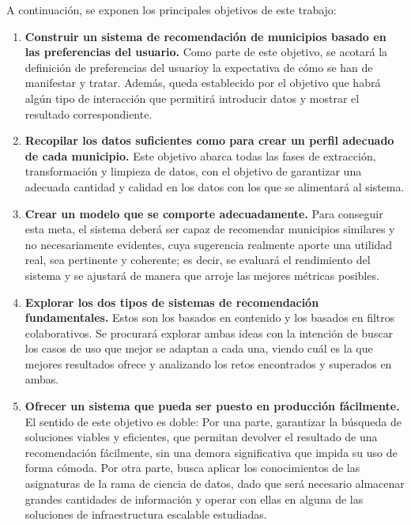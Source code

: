 
A continuación, se exponen los principales objetivos de este trabajo:

\begin{enumerate}
    \item \textbf{Construir un sistema de recomendación de municipios basado en las preferencias del usuario.} Como parte de este objetivo, se acotará la definición de \guillemotleft preferencias del usuario\guillemotright\space y la expectativa de cómo se han de manifestar y tratar. Además, queda establecido por el objetivo que habrá algún tipo de interacción que permitirá introducir datos y mostrar el resultado correspondiente.
    \item \textbf{Recopilar los datos suficientes como para crear un perfil adecuado de cada municipio.} Este objetivo abarca todas las fases de extracción, transformación y limpieza de datos, con el objetivo de garantizar una adecuada cantidad y calidad en los datos con los que se alimentará al sistema.
    \item \textbf{Crear un modelo que se comporte adecuadamente.} Para conseguir esta meta, el sistema deberá ser capaz de recomendar municipios similares y no necesariamente evidentes, cuya sugerencia realmente aporte una utilidad real, sea pertinente y coherente; es decir, se evaluará el rendimiento del sistema y se ajustará de manera que arroje las mejores métricas posibles.
    \item \textbf{Explorar los dos tipos de sistemas de recomendación fundamentales.} Estos son los basados en contenido y los basados en filtros colaborativos. Se procurará explorar ambas ideas con la intención de buscar los casos de uso que mejor se adaptan a cada una, viendo cuál es la que mejores resultados ofrece y analizando los retos encontrados y superados en ambas.
    \item \textbf{Ofrecer un sistema que pueda ser puesto en producción fácilmente.} El sentido de este objetivo es doble: Por una parte, garantizar la búsqueda de soluciones viables y eficientes, que permitan devolver el resultado de una recomendación fácilmente, sin una demora significativa que impida su uso de forma cómoda. Por otra parte, busca aplicar los conocimientos de las asignaturas de la rama de ciencia de datos, dado que será necesario almacenar grandes cantidades de información y operar con ellas en alguna de las soluciones de infraestructura escalable estudiadas.

\end{enumerate}
